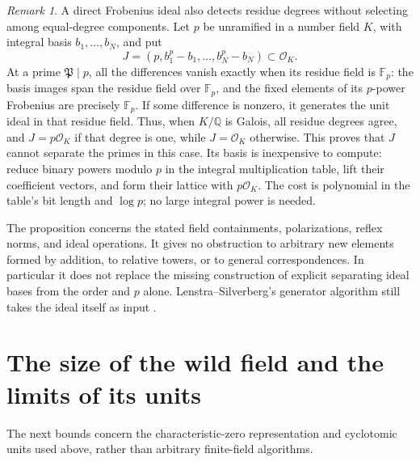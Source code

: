 \documentclass[11pt]{article}
\theoremstyle{definition}
\theoremstyle{remark}
\newtheorem{remark}[theorem]{Remark}
\begin{document}
\begin{remark}\label{rem:frobenius-ideal-equal-degree}
A direct Frobenius ideal also detects residue degrees without
selecting among equal-degree components. Let \(p\) be unramified in a
number field \(K\), with integral basis \(b_1,\ldots,b_N\), and put
\[
 J=(p,b_1^p-b_1,\ldots,b_N^p-b_N)\subset\mathcal O_K.
\]
At a prime \(\mathfrak P\mid p\), all the differences vanish
exactly when its residue field is \(\mathbb F_p\): the basis images
span the residue field over \(\mathbb F_p\), and the fixed elements
of its \(p\)-power Frobenius are precisely \(\mathbb F_p\).
If some difference is nonzero, it generates the unit ideal in that
residue field. Thus, when \(K/\mathbb Q\) is Galois, all residue
degrees agree, and \(J=p\mathcal O_K\) if that degree is one,
while \(J=\mathcal O_K\) otherwise. This proves that \(J\) cannot
separate the primes in this case. Its basis is inexpensive to compute:
reduce binary powers modulo \(p\) in the integral multiplication
table, lift their coefficient vectors, and form their lattice with
\(p\mathcal O_K\). The cost is polynomial in the table's bit length
and \(\log p\); no large integral power is needed.
\end{remark}

The proposition concerns the stated field containments, polarizations,
reflex norms, and ideal operations.  It gives no obstruction to arbitrary
new elements formed by addition, to relative towers, or to general
correspondences.  In particular it does not replace the missing
construction of explicit separating ideal bases from the order and
$p$ alone.  Lenstra--Silverberg's generator algorithm still takes the
ideal itself as input
\citep[Theorem~1.3, author manuscript p.~2]{LenstraSilverberg2019CMOrders}.

\section{The size of the wild field and the limits of its units}
The next bounds concern the characteristic-zero representation and cyclotomic units used above, rather than arbitrary finite-field algorithms.
\end{document}
